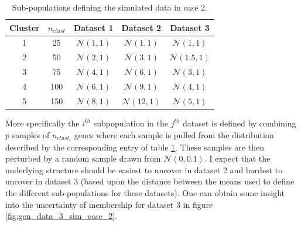 \documentclass[12pt]{article} %
\begin{document}
	\begin{table}[!htb] 
		\centering
		\begin{tabular}{c|c|ccc} 
			Cluster & $n_{clust}$	& Dataset 1	& Dataset 2	& Dataset 3	\\ 
			\hline
			1 		&	25 		& $\mathcal{N}(1,1)$	& $\mathcal{N}(1,1)$ 	& $\mathcal{N}(1,1)$	\\
			2 		&	50		& $\mathcal{N}(2,1)$	& $\mathcal{N}(3,1)$ 	& $\mathcal{N}(1.5,1)$	\\
			3 		& 	75		& $\mathcal{N}(4,1)$	& $\mathcal{N}(6,1)$ 	& $\mathcal{N}(3,1)$	\\
			4 		&	100		& $\mathcal{N}(6,1)$	& $\mathcal{N}(9,1)$ 	& $\mathcal{N}(4,1)$	\\
			5 		&	150 	& $\mathcal{N}(8,1)$	& $\mathcal{N}(12,1)$ 	& $\mathcal{N}(5,1)$	
		\end{tabular}
		\caption{Sub-populations defining the simulated data in case 2.}
		\label{table:generated_data_case_2}
	\end{table}
	
	More specifically the $i^{th}$ subpopulation in the $j^{th}$ dataset is defined by combining $p$ samples of $n_{clust_i}$ genes where each sample is pulled from the distribution described by the corresponding entry of table \ref{table:generated_data_case_2}. These samples are then perturbed by a random sample drawn from $\mathcal{N}(0,0.1)$. I expect that the underlying structure should be easiest to uncover in dataset 2 and hardest to uncover in dataset 3 (based upon the distance between the means used to define the different sub-populations for these datasets). One can obtain some insight into the uncertainty of membership for dataset 3 in figure \ref{fig:gen_data_3_sim_case_2}.
\end{document}
